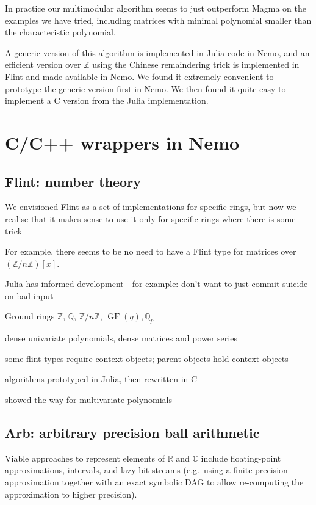 \documentclass{sig-alternate-05-2015}
\begin{document}
In practice our multimodular algorithm seems to just outperform Magma on the
examples we have tried, including matrices with minimal polynomial smaller 
than the characteristic polynomial.

A generic version of this algorithm is implemented in Julia code in Nemo, and
an efficient version over $\mathbb{Z}$ using the Chinese remaindering trick
is implemented in Flint and made available in Nemo.
We found it extremely convenient to prototype the generic version first in
Nemo. We then found it quite easy to implement a C version from the Julia
implementation.

\section{C/C++ wrappers in Nemo}

\subsection{Flint: number theory}

We envisioned Flint as a set of implementations for specific rings,
but now we realise that it makes sense to use it only for specific
rings where there is some trick

For example, there seems to be no need to have a Flint type for
matrices over $\left(\mathbb{Z}/n\mathbb{Z}\right)[x]$.

Julia has informed development - for example: don't want to just commit suicide
on bad input

Ground rings $\mathbb{Z}$, $\mathbb{Q}$, $\mathbb{Z}/n\mathbb{Z}$,
$\operatorname{GF}(q), \mathbb{Q}_p$

dense univariate polynomials, dense matrices
and power series

some flint types require context objects; parent objects hold context objects

algorithms prototyped in Julia, then rewritten in C

showed the way for multivariate polynomials 

\subsection{Arb: arbitrary precision ball arithmetic}

Viable approaches to represent elements of $\mathbb{R}$ and $\mathbb{C}$
include floating-point approximations,
intervals, and lazy bit streams (e.g.\ using a finite-precision
approximation together with an exact symbolic DAG
to allow re-computing the approximation to higher precision).
\end{document}
